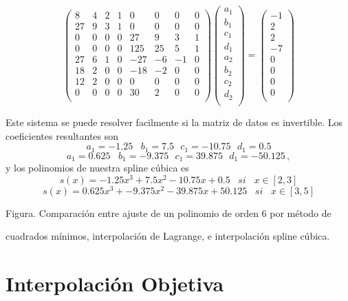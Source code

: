 \documentclass[
]{agujournal2019}
\begin{document}
\[\left(\begin{array}{cccccccc}
  8 & 4 & 2 & 1 & 0 & 0 & 0 & 0\\
  27 & 9 & 3 & 1 & 0 & 0 & 0 & 0\\
  0 & 0 & 0 & 0 & 27 & 9 & 3 & 1\\
  0 & 0 & 0 & 0 & 125 & 25 & 5 & 1\\
  27 & 6 & 1 & 0 & -27 & -6 & -1 & 0\\
  18 & 2 & 0 & 0 & -18 & -2 & 0 & 0\\
  12 & 2 & 0 & 0 & 0 & 0 & 0 & 0\\
  0 & 0 & 0 & 0 & 30 & 2 & 0 & 0\\
    \end{array}\right)\left(\begin{array}{c}
  a_1 \\
  b_1 \\
  c_1 \\
  d_1 \\
  a_2 \\
  b_2 \\
  c_2 \\
  d_2 \\
    \end{array}\right)=
    \left(\begin{array}{c}
  -1 \\
  2 \\
  2 \\
  -7 \\
  0 \\
  0 \\
  0 \\
  0 \\
    \end{array}\right)\]

Este sistema se puede resolver facilmente si la matriz de datos es
invertible. Los coeficientes resultantes son
\[a_1=-1.25\,\,\,\,\,b_1=7.5\,\,\,\,c_1=-10.75\,\,\,\,d_1=0.5\]
\[a_1=0.625\,\,\,\,\,b_1=-9.375\,\,\,\,c_1=39.875\,\,\,\,d_1=-50.125\,,\]
y los polinomios de nuestra spline cúbica es
\[s(x)=-1.25x^3+7.5x^2-10.75x+0.5\,\,\,\,\,{ si}\,\,\,\,\,x\in[2,3]\]
\[s(x)=0.625x^3+-9.375x^2-39.875x+50.125\,\,\,\,\,{ si}\,\,\,\,\,x\in[3,5]\]

\centerline{Figura. Comparación entre ajuste de un polinomio de orden 6
por método de}
\centerline{cuadrados mínimos, interpolación de Lagrange, e interpolación
spline cúbica.}

\section{Interpolación Objetiva}\label{interpolaciuxf3n-objetiva}
\end{document}

